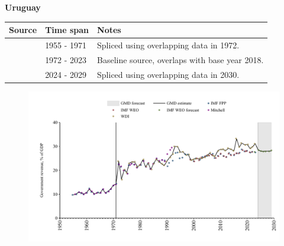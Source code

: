 \documentclass[12pt,a4paper,landscape]{article}
\begin{document}
\begin{adjustbox}{max totalsize={\paperwidth}{\paperheight},center}
\begin{minipage}[t][\textheight][t]{\textwidth}
\vspace*{0.5cm}
{}
\begin{center}
{\Large\bfseries Uruguay}
\end{center}
\vspace{0.5cm}
\begin{table}[H]
\centering
\small
\begin{tabular}{|l|l|l|}
\hline
\textbf{Source} & \textbf{Time span} & \textbf{Notes} \\
\hline
\rowcolor{white}\cite{IMF_FPP}& 1955 - 1971 &Spliced using overlapping data in 1972.\\
\rowcolor{lightgray}\cite{WDI}& 1972 - 2023 &Baseline source, overlaps with base year 2018.\\
\rowcolor{white}\cite{IMF_WEO_forecast}& 2024 - 2029 &Spliced using overlapping data in 2030.\\
\hline
\end{tabular}
\end{table}
\begin{figure}[H]
\centering
\includegraphics[width=\textwidth,height=0.6\textheight,keepaspectratio]{graphs/URY_govrev_GDP.pdf}
\end{figure}
\end{minipage}
\end{adjustbox}
\end{document}
